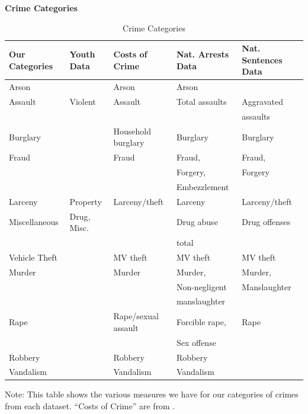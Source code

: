 \documentclass[static]{JJH-Beamer}
\begin{document}
\begin{frame}
 \addtocounter{framenumber}{-1}

\begin{center}
\textbf{Crime Categories}
\end{center}
\begin{table}[H]
\caption{Crime Categories} \label{tab:crime_cat}
\begin{center}
\begin{tabular}{lllll}
\toprule
{Our Categories}	&	{Youth Data} & {Costs of Crime} & {Nat. Arrests Data} & {Nat. Sentences Data}	\\
\midrule
{Arson}			&			& Arson					&	Arson			&					\\	
{Assault}			&	Violent			& Assault				&	Total assaults	& Aggravated 		\\		
				&				&						&					& assaults 			\\ 		
{Burglary}		&				& Household burglary	&	Burglary		& Burglary			\\		
{Fraud}			&				& Fraud					&	Fraud,			& Fraud,			\\		
				&				&						&	Forgery,		& Forgery			\\
				&				&						&	Embezzlement	&					\\		
{Larceny}			&	Property	& Larceny/theft			&	Larceny			& Larceny/theft		\\		
{Miscellaneous}	& 	Drug, Misc.	& 					&	Drug abuse		& Drug offenses		\\		
				&				&						&	total			&					\\ 		
{Vehicle Theft}	&				& MV theft	&	MV theft		& MV theft			\\		
{Murder}			&				& Murder				&	Murder,			& Murder,			\\	
				&				&						& 	Non-negligent 	& Manslaughter		\\
				&				&						& 	manslaughter	&   				\\
{Rape}			&				& Rape/sexual assault	&	Forcible rape, 	& Rape 				\\
				&				&						&	Sex offense		&					\\
{Robbery}			&				& Robbery 				&	Robbery			&					\\
{Vandalism}		&				& Vandalism				&	Vandalism		& 				\\	\bottomrule
\end{tabular}
\end{center}
{\flushleft \tiny Note: This table shows the various measures we have for our categories of crimes from each dataset. ``Costs of Crime'' are from \cite{McCollister_etal_2010_DAD}.\\}
\end{table}

\end{frame}
\end{document}
